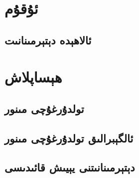 
\section{ئۇقۇم}
\subsection{ئالاھېدە دېتېرمىنانىت}

\section{ھېساپلاش}
\subsection{تولدۇرغۇچى مىنور}
\subsection{ئالگېبرالىق تولدۇرغۇچى مىنور}
\subsection{دېتېرمىنانىتنى يېيىش قائىدىسى}
